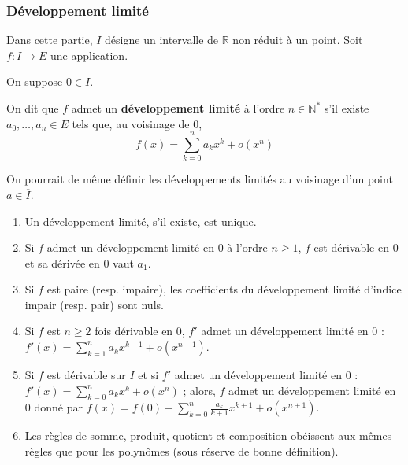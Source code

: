   \subsubsection{Développement limité}

  Dans cette partie, $I$ désigne un intervalle de $\mathbb{R}$ non réduit à un point. Soit $f : I \rightarrow E$ une application.


  On suppose $0 \in I$.

  \begin{definition}
    On dit que $f$ admet un \textbf{développement limité} à l'ordre $n \in \mathbb{N}^*$ s'il existe $a_0, \dots, a_n \in E$ tels que, au voisinage de $0$,
    \[ f(x) = \sum_{k=0}^{n} a_k x^k + o(x^n) \]
  \end{definition}

  \begin{remark}
    On pourrait de même définir les développements limités au voisinage d'un point $a \in \overline{I}$.
  \end{remark}

  \begin{proposition}
    \begin{enumerate}[label={\bfseries(\roman*)}]
      \item Un développement limité, s'il existe, est unique.
      \item Si $f$ admet un développement limité en $0$ à l'ordre $n \geq 1$, $f$ est dérivable en $0$ et sa dérivée en $0$ vaut $a_1$.
      \item Si $f$ est paire (resp. impaire), les coefficients du développement limité d'indice impair (resp. pair) sont nuls.
      \item Si $f$ est $n \geq 2$ fois dérivable en $0$, $f'$ admet un développement limité en $0$ : $f'(x) = \sum_{k=1}^{n} a_k x^{k-1} + o(x^{n-1})$.
      \item Si $f$ est dérivable sur $I$ et si $f'$ admet un développement limité en $0$ : $f'(x) = \sum_{k=0}^{n} a_k x^k + o(x^n)$ ; alors, $f$ admet un développement limité en $0$ donné par $f(x) = f(0) + \sum_{k=0}^{n} \frac{a_k}{k+1} x^{k+1} + o(x^{n+1})$.
      \item Les règles de somme, produit, quotient et composition obéissent aux mêmes règles que pour les polynômes (sous réserve de bonne définition).
    \end{enumerate}
  \end{proposition}

